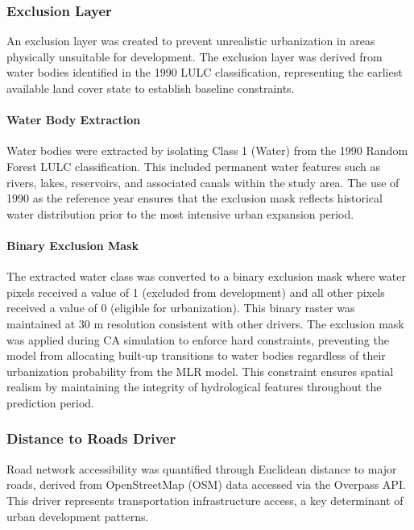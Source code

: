 \documentclass[conference]{IEEEtran}
\begin{document}
\subsubsection{Exclusion Layer}

An exclusion layer was created to prevent unrealistic urbanization in areas physically unsuitable for development. The exclusion layer was derived from water bodies identified in the 1990 LULC classification, representing the earliest available land cover state to establish baseline constraints.

\paragraph{Water Body Extraction}
Water bodies were extracted by isolating Class 1 (Water) from the 1990 Random Forest LULC classification. This included permanent water features such as rivers, lakes, reservoirs, and associated canals within the study area. The use of 1990 as the reference year ensures that the exclusion mask reflects historical water distribution prior to the most intensive urban expansion period.

\paragraph{Binary Exclusion Mask}
The extracted water class was converted to a binary exclusion mask where water pixels received a value of 1 (excluded from development) and all other pixels received a value of 0 (eligible for urbanization). This binary raster was maintained at 30 m resolution consistent with other drivers. The exclusion mask was applied during CA simulation to enforce hard constraints, preventing the model from allocating built-up transitions to water bodies regardless of their urbanization probability from the MLR model. This constraint ensures spatial realism by maintaining the integrity of hydrological features throughout the prediction period.

\subsubsection{Distance to Roads Driver}

Road network accessibility was quantified through Euclidean distance to major roads, derived from OpenStreetMap (OSM) data accessed via the Overpass API. This driver represents transportation infrastructure access, a key determinant of urban development patterns.
\end{document}
